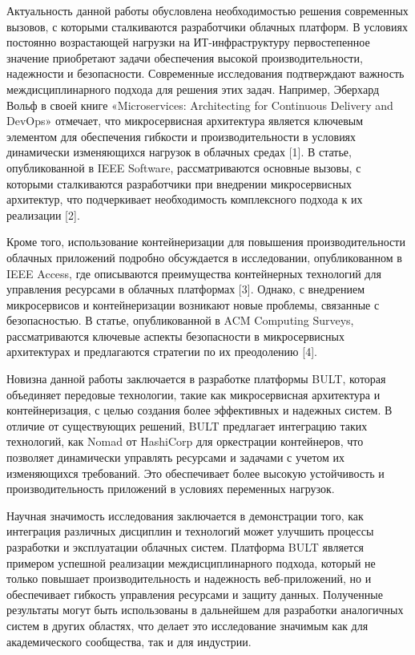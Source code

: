 {Актуальность данной работы обусловлена необходимостью решения
современных вызовов, с которыми сталкиваются разработчики облачных
платформ. В условиях постоянно возрастающей нагрузки на
ИТ-инфраструктуру первостепенное значение приобретают задачи обеспечения
высокой производительности, надежности и безопасности. Современные
исследования подтверждают важность междисциплинарного подхода для
решения этих задач. Например, Эберхард Вольф в своей книге
«Microservices: Architecting for Continuous Delivery and DevOps»
отмечает, что микросервисная архитектура является ключевым элементом для
обеспечения гибкости и производительности в условиях динамически
изменяющихся нагрузок в облачных средах {[}1{]}. В статье,
опубликованной в IEEE Software, рассматриваются основные вызовы, с
которыми сталкиваются разработчики при внедрении микросервисных
архитектур, что подчеркивает необходимость комплексного подхода к их
реализации {[}2{]}.

Кроме того, использование контейнеризации для повышения
производительности облачных приложений подробно обсуждается в
исследовании, опубликованном в IEEE Access, где описываются преимущества
контейнерных технологий для управления ресурсами в облачных платформах
{[}3{]}. Однако, с внедрением микросервисов и контейнеризации возникают
новые проблемы, связанные с безопасностью. В статье, опубликованной в
ACM Computing Surveys, рассматриваются ключевые аспекты безопасности в
микросервисных архитектурах и предлагаются стратегии по их преодолению
{[}4{]}.

Новизна данной работы заключается в разработке платформы BULT, которая
объединяет передовые технологии, такие как микросервисная архитектура и
контейнеризация, с целью создания более эффективных и надежных систем. В
отличие от существующих решений, BULT предлагает интеграцию таких
технологий, как Nomad от HashiCorp для оркестрации контейнеров, что
позволяет динамически управлять ресурсами и задачами с учетом их
изменяющихся требований. Это обеспечивает более высокую устойчивость и
производительность приложений в условиях переменных нагрузок.

Научная значимость исследования заключается в демонстрации того, как
интеграция различных дисциплин и технологий может улучшить процессы
разработки и эксплуатации облачных систем. Платформа BULT является
примером успешной реализации междисциплинарного подхода, который не
только повышает производительность и надежность веб-приложений, но и
обеспечивает гибкость управления ресурсами и защиту данных. Полученные
результаты могут быть использованы в дальнейшем для разработки
аналогичных систем в других областях, что делает это исследование
значимым как для академического сообщества, так и для индустрии.

}
